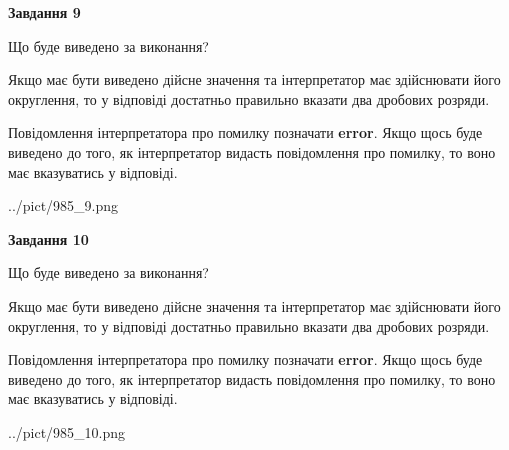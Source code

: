 \documentclass[12pt, ukrainian]{article}
\begin{document}
{\begin {Large}
{\begin {center}\textbf{Завдання 9}\end {center}}\par
Що буде виведено за виконання? \par

Якщо має бути виведено дійсне значення та інтерпретатор має здійснювати його округлення, 
то у відповіді достатньо правильно вказати два дробових розряди.

Повідомлення інтерпретатора про помилку позначати \textbf{error}.
Якщо щось буде виведено до того, як інтерпретатор видасть повідомлення про помилку, 
то воно має вказуватись у відповіді. \par

\begin{center}
	{../pict/985_9.png}
\end{center}
\newpage

{\begin {center}\textbf{Завдання 10}\end {center}}\par
Що буде виведено за виконання? \par

Якщо має бути виведено дійсне значення та інтерпретатор має здійснювати його округлення, 
то у відповіді достатньо правильно вказати два дробових розряди.

Повідомлення інтерпретатора про помилку позначати \textbf{error}.
Якщо щось буде виведено до того, як інтерпретатор видасть повідомлення про помилку, 
то воно має вказуватись у відповіді. \par

\begin{center}
	{../pict/985_10.png}
\end{center}
\newpage

\end {Large}}
\end{document}
